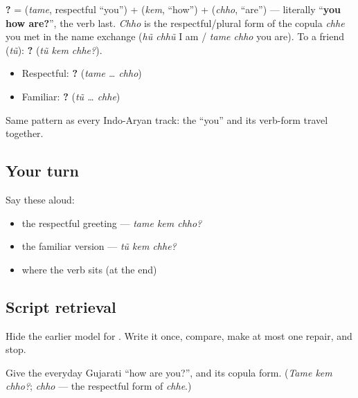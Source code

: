 \begin{cousinweb}
\textbf{  ?} = \textbf{} (\emph{tame}, respectful \textquotedblleft{}you\textquotedblright{}) + \textbf{} (\emph{kem}, \textquotedblleft{}how\textquotedblright{}) + \textbf{} (\emph{chho}, \textquotedblleft{}are\textquotedblright{}) — literally \textquotedblleft{}\textbf{you how are?}\textquotedblright{}, the verb last. \emph{Chho} is the respectful/plural form of the copula \emph{chhe} you met in the name exchange (\emph{hũ chhũ} I am / \emph{tame chho} you are). To a friend (\emph{tũ}): \textbf{  ?} (\emph{tũ kem chhe?}).
\end{cousinweb}

\begin{grammarlens}[title={Grammar Lens: match the \textquotedblleft{}you\textquotedblright{} to the copula}]
\begin{itemize}
\raggedright
  \item Respectful: \textbf{  ?} (\emph{tame … chho})
  \item Familiar: \textbf{  ?} (\emph{tũ … chhe})
\end{itemize}

Same pattern as every Indo-Aryan track: the \textquotedblleft{}you\textquotedblright{} and its verb-form travel together.
\end{grammarlens}

\subsection*{Your turn}
Say these aloud:

\begin{itemize}
\raggedright
  \item the respectful greeting — \emph{tame kem chho?}
  \item the familiar version — \emph{tũ kem chhe?}
  \item where the verb sits (at the end)
\end{itemize}

\subsection*{Script retrieval}
Hide the earlier model for \textbf{}. Write it once, compare, make at most one repair, and stop.

\begin{tcolorbox}[breakable,colback=teal!4,colframe=teal!35!black,title={Before you move on}]
Give the everyday Gujarati \textquotedblleft{}how are you?\textquotedblright{}, and its copula form. (\emph{Tame kem chho?}; \emph{chho} — the respectful form of \emph{chhe}.)
\end{tcolorbox}
